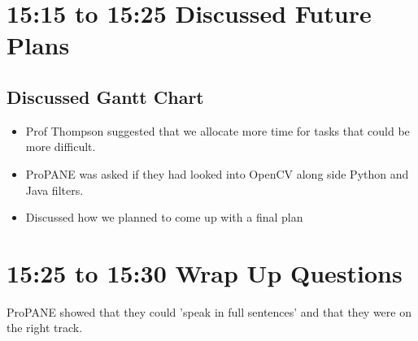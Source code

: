 \documentclass[]{article}
\begin{document}
	\section*{15:15 to 15:25 Discussed Future Plans}
		
		\subsection*{Discussed Gantt Chart}
			\begin{itemize}
				\item Prof Thompson suggested that we allocate more time for tasks that could be more difficult.
				\item ProPANE was asked if they had looked into OpenCV along side Python and Java filters. 
				\item Discussed how we planned to come up with a final plan
			\end{itemize}
		
	
	\section*{15:25 to 15:30 Wrap Up Questions}
		
		ProPANE showed that they could 'speak in full sentences' and that they were on the right track.
	
\end{document}

